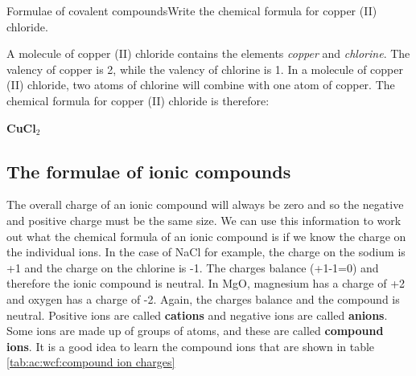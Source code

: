 \begin{wex}{Formulae of covalent compounds}{Write the chemical formula for copper (II) chloride.\\}

{
A molecule of copper (II) chloride contains the elements \textit{copper} and \textit{chlorine}.  
The valency of copper is 2, while 
the valency of chlorine is 1. In a molecule of copper (II) chloride, two atoms of chlorine will combine with one atom of copper.
The chemical formula for copper (II) chloride is therefore: 

\begin{center}
\textbf{CuCl$_{2}$}
\end{center}}
\end{wex}

\subsection{The formulae of ionic compounds}

The overall charge of an ionic compound will always be zero and so the negative and positive charge must be the same size. We can use this information to work out what the chemical formula of an ionic compound is if we know the charge on the individual ions. In the case of NaCl for example, the charge on the sodium is +1 and the charge on the chlorine is -1. The charges balance (+1-1=0) and therefore the ionic compound is neutral. In MgO, magnesium has a charge of +2 and oxygen has a charge of -2. Again, the charges balance and the compound is neutral. Positive ions are called \textbf{cations} and negative ions are called \textbf{anions}.\\

Some ions are made up of groups of atoms, and these are called \textbf{compound ions}. It is a good idea to learn the compound ions that are shown in table \ref{tab:ac:wcf:compound ion charges}

